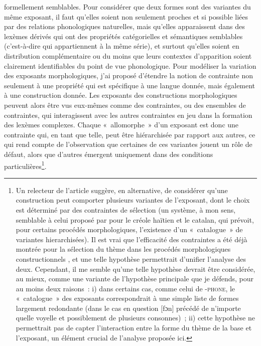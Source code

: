 \documentclass[output=paper]{langsci/langscibook}
\begin{document}
formellement semblables. Pour considérer que deux formes sont des
variantes du même exposant, il faut qu'elles soient non seulement
proches et si possible liées par des relations phonologiques naturelles,
mais qu'elles apparaissent dans des lexèmes dérivés qui ont des
propriétés catégorielles et sémantiques semblables (c'est-à-dire qui
appartiennent à la même série), et surtout qu'elles soient en
distribution complémentaire ou du moins que leurs contextes d'apparition
soient clairement identifiables du point de vue phonologique. Pour
modéliser la variation des exposants morphologiques, j'ai proposé
d'étendre la notion de contrainte non seulement à une propriété qui est
spécifique à une langue donnée, mais également à une construction
donnée. Les exposants des constructions morphologiques peuvent alors
être vus eux-mêmes comme des contraintes, ou des ensembles de
contraintes, qui interagissent avec les autres contraintes en jeu dans
la formation des lexèmes complexes. Chaque «~allomorphe~» d'un exposant
est donc une contrainte qui, en tant que telle, peut être hiérarchisée
par rapport aux autres, ce qui rend compte de l'observation que
certaines de ces variantes jouent un rôle de défaut, alors que d'autres
émergent uniquement dans des conditions particulières\footnote{Un
  relecteur de l'article suggère, en alternative, de considérer qu'une
  construction peut comporter plusieurs variantes de l'exposant, dont le
  choix est déterminé par des contraintes de sélection (un système, à
  mon sens, semblable à celui proposé par %
\citealt{Bonet2007} %
%
 pour
  le créole haïtien et le catalan, qui prévoit, pour certains procédés
  morphologiques, l'existence d'un «~catalogue~» de variantes
  hierarchisées). Il est vrai que l'efficacité des contraintes a été
  déjà montrée pour la sélection du thème dans les procédés
  morphologiques constructionnels %
\citep[cf.][]{Plenat-Roche2014,Boye15}%
%
, et une telle hypothèse permettrait d'unifier l'analyse
  des deux. Cependant, il me semble qu'une telle hypothèse devrait être
  considérée, au mieux, comme une variante de l'hypothèse principale que
  je défends, pour au moins deux raisons~: i) dans certains cas, comme
  celui de -\textsc{phone}, le «~catalogue~» des exposants correspondrait
  à une simple liste de formes largement redondante (dans le cas en
  question {[}fɔn{]} précédé de n'importe quelle voyelle et possiblement
  de plusieurs consonnes)~; ii) cette hypothèse ne permettrait pas de
  capter l'interaction entre la forme du thème de la base et l'exposant,
  un élément crucial de l'analyse proposée ici.}.
\end{document}
